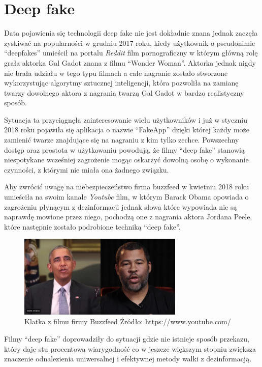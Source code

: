 \section{Deep fake}

Data pojawienia się technologii deep fake nie jest dokładnie znana jednak zaczęła zyskiwać na popularności 
w grudniu 2017 roku, kiedy użytkownik o pseudonimie ``deepfakes'' umieścił na portalu \emph{Reddit} film
pornograficzny w którym główną rolę grała aktorka Gal Gadot znana z filmu ``Wonder Woman''. Aktorka jednak 
nigdy nie brała udziału w tego typu filmach a całe nagranie zostało stworzone wykorzystując algorytmy sztucznej
inteligencji, która pozwoliła na zamianę twarzy dowolnego aktora z nagrania twarzą Gal Gadot w bardzo realistyczny sposób.

Sytuacja ta przyciągnęła zainteresowanie wielu użytkowników i już w styczniu 2018 roku pojawiła się aplikacja o nazwie
``FakeApp'' dzięki której każdy może zamienić twarze znajdujące się na nagraniu z kim tylko zechce.
Powszechny dostęp oraz prostota w użytkowaniu powodują, że filmy ``deep fake'' stanowią niespotykane wcześniej zagrożenie
mogąc oskarżyć dowolną osobę o wykonanie czynności, z którymi nie miała ona żadnego związku. 

Aby zwrócić uwagę na niebezpieczeństwo firma buzzfeed w kwietniu 2018 roku umieściła na swoim kanale \emph{Youtube} film, w którym Barack Obama opowiada 
o zagrożeniu płynącym z dezinformacji jednak słowa które wypowiada nie są naprawdę mowione przez niego, pochodzą one
z nagrania aktora Jordana Peele, które następnie zostało podrobione techniką ``deep fake''.

\begin{figure}[h!]
    \centering
    \includegraphics[width=0.7\textwidth]{./Img/peele.jpg}
    \caption{Klatka z filmu firmy Buzzfeed Źródło: https://www.youtube.com/}
\end{figure}

Filmy ``deep fake'' doprowadziły do sytuacji gdzie nie istnieje sposób przekazu, który daje stu procentową wiarygodność
co w jeszcze większym stopniu zwiększa znaczenie odnalezienia uniwersalnej i efektywnej metody walki z dezinformacją. 